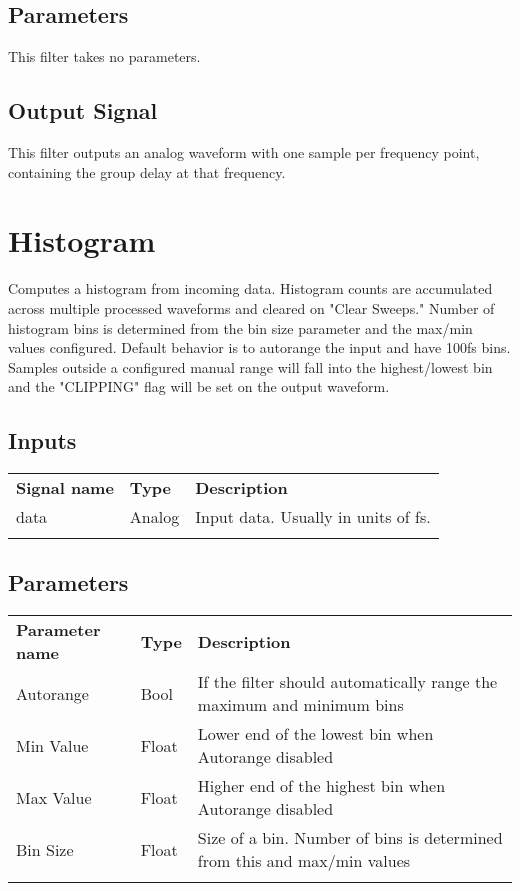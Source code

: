 \subsection{Parameters}

This filter takes no parameters.

\subsection{Output Signal}

This filter outputs an analog waveform with one sample per frequency point, containing the group delay at that
frequency.

\pagebreak
\section{Histogram}
\label{filter:histogram}

Computes a histogram from incoming data. Histogram counts are accumulated across multiple processed waveforms and cleared
on "Clear Sweeps." Number of histogram bins is determined from the bin size parameter and the max/min values configured.
Default behavior is to autorange the input and have 100fs bins. Samples outside a configured manual range will fall into
the highest/lowest bin and the "CLIPPING" flag will be set on the output waveform.

\subsection{Inputs}

\begin{tabularx}{16cm}{llX}
\thickhline
\textbf{Signal name} & \textbf{Type} & \textbf{Description} \\
\thickhline
data & Analog & Input data. Usually in units of fs.\\
\thickhline
\end{tabularx}

\subsection{Parameters}

\begin{tabularx}{16cm}{llX}
\thickhline
\textbf{Parameter name} & \textbf{Type} & \textbf{Description} \\
\thickhline
Autorange & Bool & If the filter should automatically range the maximum and minimum bins\\
\thinhline
Min Value & Float & Lower end of the lowest bin when Autorange disabled\\
\thinhline
Max Value & Float & Higher end of the highest bin when Autorange disabled\\
\thinhline
Bin Size & Float & Size of a bin. Number of bins is determined from this and max/min values\\
\thickhline
\end{tabularx}

